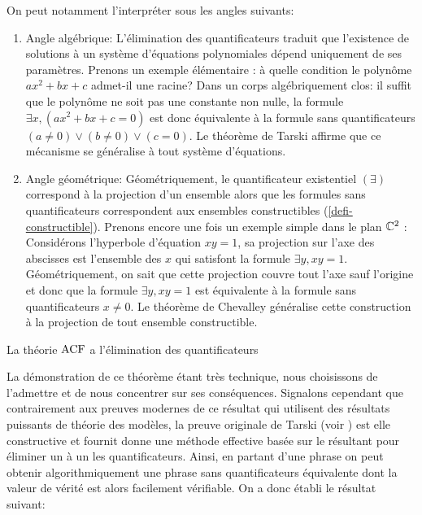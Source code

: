On peut notamment l'interpréter sous les angles suivants:
\begin{enumerate}[label= (\roman*)]
    \item Angle algébrique: L'élimination des quantificateurs traduit que
    l'existence de solutions à un système d'équations polynomiales dépend
    uniquement de ses paramètres. Prenons un exemple élémentaire : à quelle
    condition le polynôme $ax^2+bx+c$ admet-il une racine? Dans un corps
    algébriquement clos: il suffit que le polynôme ne soit pas une constante non
    nulle, la formule $\exists x, (ax^2+bx+c = 0)$ est donc équivalente à la
    formule sans quantificateurs $(a \neq 0) \vee (b \neq 0) \vee (c = 0)$.
    Le théorème de Tarski affirme que ce mécanisme se généralise à tout système
    d'équations.

    \item Angle géométrique: Géométriquement, le quantificateur existentiel
    $(\exists)$ correspond à la projection d'un ensemble alors
    que les formules sans quantificateurs correspondent aux ensembles
    constructibles (\cref{defi-constructible}). Prenons encore une fois un
    exemple simple dans le plan $\mathbb{C}^2$ : Considérons l'hyperbole d'équation
    $xy=1$, sa projection sur l'axe des abscisses est l'ensemble des $x$ qui
    satisfont la formule $\exists y, xy= 1$. Géométriquement, on sait que cette
    projection couvre tout l'axe sauf l'origine et donc que la formule $\exists y, xy= 1$ est
    équivalente à la formule sans quantificateurs $x \neq 0$. Le théorème de
    Chevalley généralise cette construction à la projection de tout ensemble constructible.
\end{enumerate}

\begin{theo}\label{theo-acf-elim}
    La théorie $\operatorname{ACF}$ a l'élimination des quantificateurs
\end{theo}

La démonstration de ce théorème étant très technique, nous choisissons de
l'admettre et de nous concentrer sur ses conséquences. Signalons cependant que contrairement
aux preuves modernes de ce résultat qui utilisent des
résultats puissants de théorie des modèles, la preuve originale de Tarski (voir \cite{Tarski_1951}) est
elle constructive et fournit donne une méthode effective basée sur le résultant pour
éliminer un à un les quantificateurs. Ainsi, en partant d'une phrase on
peut obtenir algorithmiquement une phrase sans quantificateurs équivalente dont
la valeur de vérité est alors facilement vérifiable. On a donc établi le
résultat suivant:

